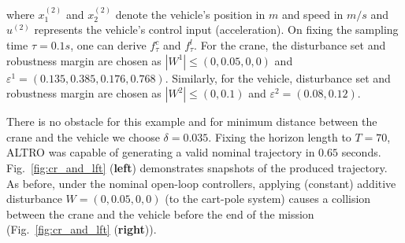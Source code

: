 where $x_1^{(2)}$ and $x_2^{(2)}$ denote the vehicle's position in $m$ and speed in $m/s$ and $u^{(2)}$ represents the vehicle's control input (acceleration). 
On fixing the sampling time $\tau=0.1s$, one can derive $f^c_\tau$ and $f^l_\tau$. For the crane, the disturbance set and robustness margin are chosen as $|W^1|\leq(0,0.05,0,0)$ and  $\varepsilon^{1}=(0.135,0.385,0.176 ,0.768)$. Similarly, for the vehicle, disturbance set and robustness margin are chosen as $|W^2|\leq(0,0.1)$ and $\varepsilon^{2}=(0.08,0.12)$.

There is no obstacle for this example and for minimum distance between the crane and the vehicle we choose $\delta=0.035$.
Fixing the horizon length to $T=70$, ALTRO was capable of generating a valid nominal trajectory in $0.65$ seconds. 
Fig.~\ref{fig:cr_and_lft} (\textbf{left}) demonstrates snapshots of the produced trajectory. 
As before, under the nominal open-loop controllers, applying (constant) additive disturbance $W=(0,0.05,0,0)$ (to the cart-pole system) 
causes a collision between the crane and the vehicle before the end of the mission (Fig.~\ref{fig:cr_and_lft} (\textbf{right})).


